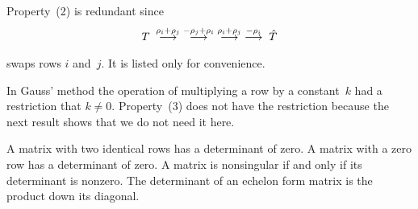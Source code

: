 \begin{remark}  \label{rem:SwapRowsRedun}
Property~(2) is redundant since
\begin{equation*}
   T\;\mathrel{ \mathop{\longrightarrow}\limits^{\rho_i+\rho_j\mathstrut}_{ \begin{subarray}{l} \relax \end{subarray}}}
    \;\mathrel{ \mathop{\longrightarrow}\limits^{-\rho_j+\rho_i\mathstrut}_{ \begin{subarray}{l} \relax \end{subarray}}}
    \;\mathrel{ \mathop{\longrightarrow}\limits^{\rho_i+\rho_j\mathstrut}_{ \begin{subarray}{l} \relax \end{subarray}}}
    \;\mathrel{ \mathop{\longrightarrow}\limits^{-\rho_i\mathstrut}_{ \begin{subarray}{l} \relax \end{subarray}}}
    \;\hat{T}
\end{equation*}
swaps rows \( i \) and~\( j \).
It is listed only for convenience.
\end{remark}

\begin{remark}
In Gauss' method the operation of multiplying a row by a constant~$k$
had a restriction that $k\neq 0$. 
Property~(3) does not have the restriction because the next result
shows that we do not need it here.
\end{remark}


\begin{lemma}   \label{le:IdenRowsDetZero}
A matrix with two identical rows has a determinant of zero.
A matrix with a zero row has a determinant of zero.
A matrix is nonsingular if and only if its determinant is nonzero.
The determinant of an echelon form matrix is the product down its diagonal.
\end{lemma}

